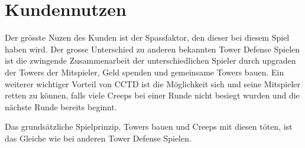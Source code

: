 \section{Kundennutzen}
Der grösste Nuzen des Kunden ist der Spassfaktor, den dieser bei diesem Spiel haben wird. Der grosse Unterschied zu anderen bekannten Tower Defense Spielen ist die zwingende Zusammenarbeit der unterschiedlichen Spieler durch upgraden der Towers der Mitspieler, Geld spenden und gemeinsame Towers bauen. Ein weiterer wichtiger Vorteil von CCTD ist die Möglichkeit sich und seine Mitspieler retten zu können, falls viele Creeps bei einer Runde nicht besiegt wurden und die nächste Runde bereits beginnt.

Das grundsätzliche Spielprinzip, Towers bauen und Creeps mit diesen töten, ist das Gleiche wie bei anderen Tower Defense Spielen.

